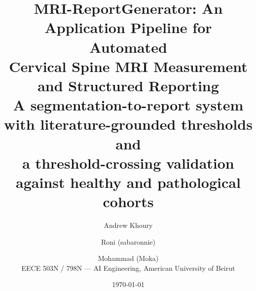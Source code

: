\documentclass[11pt,a4paper]{article}
\title{\textbf{MRI-ReportGenerator: An Application Pipeline for Automated\\
Cervical Spine MRI Measurement and Structured Reporting}\\[4pt]
\large A segmentation-to-report system with literature-grounded thresholds and\\
a threshold-crossing validation against healthy and pathological cohorts}
\author{Andrew Khoury \and Roni (sabaronnie) \and Mohammad (Moka)\\
\small EECE 503N / 798N --- AI Engineering, American University of Beirut}
\date{\today}
\begin{document}
\maketitle
\thispagestyle{fancy}

\begin{abstract}

\end{abstract}

\tableofcontents
\newpage




















\appendix







\end{document}
